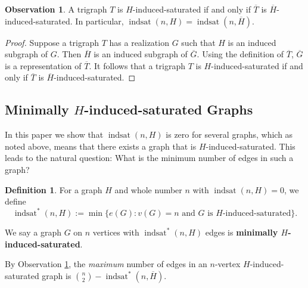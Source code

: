 \documentclass[12pt]{amsart}
\theoremstyle{plain}
\theoremstyle{definition}
\newtheorem{defn}[thm]{Definition}
\newtheorem{obs}[thm]{Observation}
\theoremstyle{remark}
\newcommand{\indsat}[2]{\ensuremath{\operatorname{indsat}(#1,#2)}\xspace}
\newcommand{\sis}[2]{\ensuremath{{\operatorname{indsat}}^*(#1,#2)}\xspace}
\newcommand{\sat}[2]{\ensuremath{\operatorname{sat}(#1,#2)}\xspace}
\renewcommand{\bar}{\overline}
\begin{document}

\begin{obs}\label{thm:complement}
A trigraph $T$ is $H$-induced-saturated if and only if $\bar T$ is $\bar H$-induced-saturated. In particular, $\indsat{n}{H}=\indsat{n}{\overline{H}}$.
\end{obs}
\begin{proof}
Suppose a trigraph $T$ has a realization $G$ such that $H$ is an induced subgraph of $G$. Then $\bar H$ is an induced subgraph of $\bar G$. Using the definition of $\bar T$,
$\bar G$ is a representation of $\bar T$.
It follows that a trigraph $T$ is $H$-induced-saturated if and only if $\bar T$ is $\bar H$-induced-saturated.
\end{proof}


\subsection{Minimally $H$-induced-saturated Graphs}

In this paper we show that $\indsat{n}{H}$ is zero for several graphs, which as noted above, means that there exists a graph that is $H$-induced-saturated.
This leads to the natural question: What is the minimum number of edges in such a graph?

\begin{defn}
For a graph $H$ and whole number $n$ with $\indsat{n}{H}=0$, we define
$$\sis{n}{H}:=\min\{e(G):v(G)=n \text{ and }G\text{ is }H\text{-induced-saturated}\}.$$

We say a graph $G$ on $n$ vertices with $\sis{n}{H}$ edges is {\bf minimally $H$-induced-saturated}.\end{defn}

By Observation \ref{thm:complement}, the \emph{maximum} number of edges in an $n$-vertex $H$-induced-saturated graph is
${n \choose 2} - \sis{n}{\overline H}$.
\end{document}
